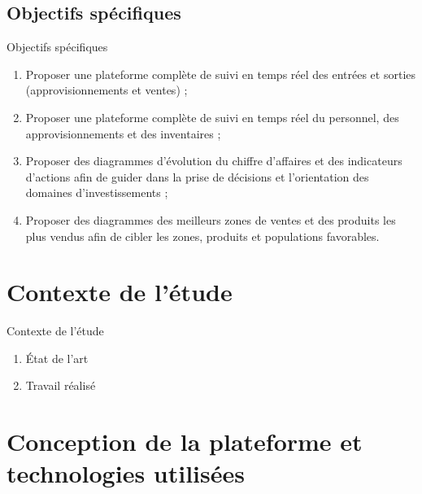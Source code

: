 \documentclass[xcolor=dvipsnames]{beamer}
\begin{document}
  
  \subsection{Objectifs spécifiques}
    \begin{frame}{Objectifs spécifiques}
      \begin{enumerate}
      \item Proposer une plateforme complète de suivi en temps réel des entrées et sorties (approvisionnements et ventes) ;
      \pause
      \item Proposer une plateforme complète de suivi en temps réel du personnel, des approvisionnements et des inventaires ;
      \pause
      \item Proposer des diagrammes d’évolution du chiffre d’affaires et des indicateurs d’actions afin de guider dans la prise de décisions et l’orientation des domaines d’investissements ;
      \pause
      \item Proposer des diagrammes des meilleurs zones de ventes et des produits les plus vendus afin de cibler les zones, produits et populations favorables.
      \end{enumerate}
    \end{frame}
    
  \section{Contexte de l'étude}
  \begin{frame}{Contexte de l'étude}
  \begin{enumerate}
  \item État de l'art
  \pause		
  \item Travail réalisé  		
  \end{enumerate}  	
  \end{frame}
  
  \section{Conception de la plateforme et technologies utilisées}
\end{document}
